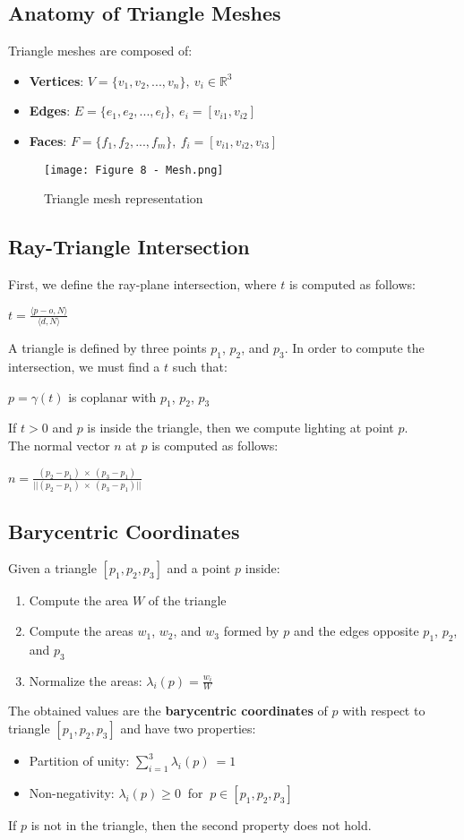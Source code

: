 \documentclass{article}
\begin{document}
\subsection{Anatomy of Triangle Meshes}
Triangle meshes are composed of:
\begin{itemize}
    \item \textbf{Vertices}: $ V = \{v_1,v_2,...,v_n\}, \ v_i \in \mathbb{R}^3 $
    \item \textbf{Edges}: $ E = \{e_1,e_2,...,e_l\}, \ e_i = [v_{i1},v_{i2}] $
    \item \textbf{Faces}: $F = \{f_1,f_2,...,f_m\}, \ f_i = [v_{i1}, v_{i2}, v_{i3}] $
\end{itemize}
\begin{figure}[H]
    \centering
    \texttt{[image: Figure 8 - Mesh.png]}
    \caption{Triangle mesh representation}
\end{figure}
\subsection{Ray-Triangle Intersection}
First, we define the ray-plane intersection, where $t$ is computed as follows:
\begin{center}
    $t = \displaystyle\frac{\langle p - o,N\rangle}{\langle d,N\rangle}$
\end{center}
A triangle is defined by three points $p_1$, $p_2$, and $p_3$. In order to compute the intersection, we must find a $t$ such that:
\begin{center}
    $p = \gamma(t)$ is coplanar with $p_1$, $p_2$, $p_3$
\end{center}
If $ t > 0 $ and $ p $ is inside the triangle, then we compute lighting at point $p$. \\
The normal vector $ n $ at $ p $ is computed as follows:
\begin{center}
    $n = \displaystyle\frac{(p_2 - p_1) \ \times \ (p_3 - p_1)}{||(p_2 - p_1) \ \times \ (p_3 - p_1)||}$
\end{center}
\subsection{Barycentric Coordinates}
Given a triangle $[p_1, p_2, p_3]$ and a point $p$ inside:
\begin{enumerate}
    \item Compute the area $W$ of the triangle
    \item Compute the areas $w_1$, $w_2$, and $w_3$ formed by $p$ and the edges opposite $p_1$, $p_2$, and $p_3$
    \item Normalize the areas: $\lambda_i(p) = \displaystyle\frac{w_i}{W}$
\end{enumerate}
The obtained values are the \textbf{barycentric coordinates} of $p$ with respect to triangle $[p_1, p_2, p_3]$ and have two properties:
\begin{itemize}
    \item Partition of unity: $\displaystyle\sum^3_{i=1} \lambda_i(p) \ = 1$
    \item Non-negativity: $\lambda_i(p) \geq 0 \ $ for $\ p \in [p_1,p_2,p_3]$
\end{itemize}
If $p$ is not in the triangle, then the second property does not hold.
\end{document}

